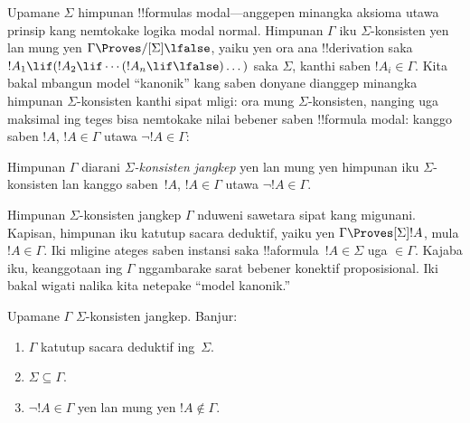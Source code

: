 \documentclass[../../../include/open-logic-section]{subfiles}
\begin{document}


Upamane $\Sigma$ himpunan !!{formula}s modal---anggepen minangka
aksioma utawa prinsip kang nemtokake logika modal normal. Himpunan $\Gamma$
iku $\Sigma$-konsisten yen lan mung yen $\Gamma \Proves/[\Sigma] \lfalse$,
yaiku yen ora ana !!{derivation} saka~$!A_1 \lif (!A_2 \lif \cdots (!A_n \lif
\lfalse)\dots)$ saka $\Sigma$, kanthi saben $!A_i \in \Gamma$. Kita bakal
mbangun model ``kanonik'' kang saben donyane dianggep minangka himpunan
$\Sigma$-konsisten kanthi sipat mligi: ora mung $\Sigma$-konsisten,
nanging uga maksimal ing teges bisa nemtokake nilai bebener saben
!!{formula} modal: kanggo saben $!A$, $!A
\in \Gamma$ utawa $\lnot !A \in \Gamma$:

\begin{defn}
  Himpunan $\Gamma$ diarani \emph{$\Sigma$-konsisten jangkep} yen lan
  mung yen himpunan iku $\Sigma$-konsisten lan kanggo saben~$!A$,
  $!A \in \Gamma$ utawa $\lnot !A \in \Gamma$.
\end{defn}

Himpunan $\Sigma$-konsisten jangkep $\Gamma$ nduweni sawetara
sipat kang migunani. Kapisan, himpunan iku katutup sacara deduktif,
yaiku yen $\Gamma \Proves[\Sigma] !A$, mula $!A \in \Gamma$.
Iki mligine ateges saben instansi saka !!a{formula}~$!A \in \Sigma$
uga $\in \Gamma$. Kajaba iku, keanggotaan ing $\Gamma$ nggambarake
sarat bebener konektif proposisional. Iki bakal wigati nalika kita
netepake ``model kanonik.''

\begin{prop}
  Upamane $\Gamma$ $\Sigma$-konsisten jangkep. Banjur:
  \begin{enumerate}
  \item {}%
    $\Gamma$ katutup sacara deduktif ing~$\Sigma$.
  \item {}%
    $\Sigma \subseteq \Gamma$.
  \item {}%
    $\lnot!A \in \Gamma$ yen lan mung yen $!A \notin
    \Gamma$.
  \end{enumerate}
\end{prop}
\end{document}
